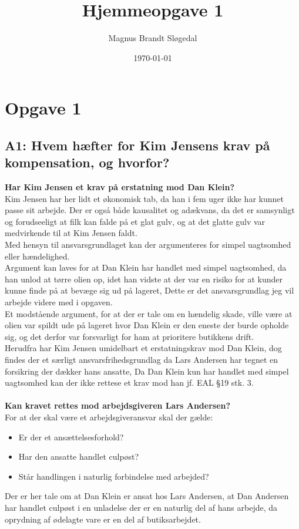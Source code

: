 \documentclass[11pt, a4paper]{article}
\title{Hjemmeopgave 1}
\author{Magnus Brandt Sløgedal}
\date{\today}
\begin{document}
\maketitle
\section{Opgave 1}
\subsection*{A1: Hvem hæfter for Kim Jensens krav på kompensation, og hvorfor?}
\textbf{Har Kim Jensen et krav på erstatning mod Dan Klein?}\\
Kim Jensen har her lidt et økonomisk tab, da han i fem uger ikke har kunnet
passe sit arbejde. Der er også både kausalitet og adækvans, da det er
samsynligt og forudseeligt at filk kan falde på et glat gulv, og at det glatte
gulv var medvirkende til at Kim Jensen faldt.\\
Med hensyn til ansvarsgrundlaget kan der argumenteres for simpel uagtsomhed
eller hændelighed.\\
Argument kan laves for at Dan Klein har handlet med simpel uagtsomhed, da han
unlod at tørre olien op, idet han vidste at der var en risiko for at kunder
kunne finde på at bevæge sig ud på lageret, Dette er det ansvarsgrundlag jeg vil
arbejde videre med i opgaven.\\
Et modstående argument, for at der er tale om en hændelig skade, ville være at
olien var spildt ude på lageret hvor Dan Klein er den eneste der burde opholde
sig, og det derfor var forsvarligt for ham at prioritere butikkens drift.\\
Herudfra har Kim Jensen umidelbart et erstatningskrav mod Dan Klein, dog findes
der et særligt ansvarsfrihedsgrundlag da Lars Andersen har tegnet en forsikring
der dækker hans ansatte, Da Dan Klein kun har handlet med simpel uagtsomhed kan
der ikke rettese et krav mod han jf. EAL §19 stk. 3.\\
\\
\textbf{Kan kravet rettes mod arbejdsgiveren Lars Andersen?}\\
For at der skal være et arbejdsgiveransvar skal der gælde:
\begin{itemize}
  \item Er der et ansættelsesforhold?
  \item Har den ansatte handlet culpøst?
  \item Står handlingen i naturlig forbindelse med arbejded?
\end{itemize}
Der er her tale om at Dan Klein er ansat hos Lars Andersen, at Dan Andersen
har handlet culpøst i en unladelse der er en naturlig del af hans arbejde, da
oprydning af ødelagte vare er en del af butiksarbejdet.
\end{document}
